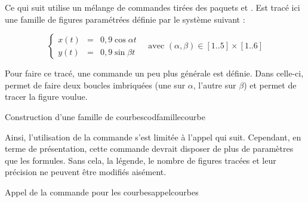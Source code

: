 Ce qui suit utilise un mélange de commandes tirées des paquets  et . Est tracé ici une famille de figures paramétrées définie par le système suivant :

$$
\left\{
\begin{array}{lcr}
x(t)&=& 0,9 \cos \alpha t \\
y(t)&=& 0,9 \sin \beta t  
\end{array}  \quad \textrm{avec } (\alpha,\beta) \in [1..5]\times[1..6]
\right.
$$

Pour faire ce tracé, une commande un peu plus générale est définie. Dans celle-ci,  permet de faire deux boucles imbriquées (une sur $\alpha$, l'autre sur $\beta$) et  permet de tracer la figure voulue.

\begin{codesimple}{Construction d'une famille de courbes}{codfamillecourbe}
\newcommand{\figu}[1]{
\begin{figure}[H]
\begin{center}
\fbox{
\begin{pspicture}(12.3,15.2)
  \multido{\Na=1.1+2.5,\Ia=1+1}{5}{
    \multido{\Nb=13.9+-2.5,\Ib=1+1}{6}{
      \rput{0}(\Na,\Nb){
        \parametricplot[plotstyle=curve,plotpoints=199,linecolor=bleu6,
        algebraic=true]{0}{6.2832}{#1}
        \rput{0}(0,-1.2){\textsf{\footnotesize (\Ia,\Ib)}}}
}}
\end{pspicture}}
\caption{Exemples de fonctions paramétriques}
\end{center}
\end{figure}}
\end{codesimple}


Ainsi, l'utilisation de la  commande s'est limitée à l'appel qui suit. Cependant, en terme de présentation, cette  commande devrait disposer de plus de paramètres que les formules. Sans cela, la légende, le nombre de figures tracées et leur précision ne peuvent être modifiés aisément.

\begin{codesimple}{Appel de la  commande pour les courbes}{appelcourbes}
\end{codesimple}


\newcommand{\figu}[1]{
\begin{figure}[H]
\begin{center}
\fbox{
\begin{pspicture}(12.3,15.2)
  \multido{\Na=1.1+2.5,\Ia=1+1}{5}{
    \multido{\Nb=13.9+-2.5,\Ib=1+1}{6}{
      \rput{0}(\Na,\Nb){
        \parametricplot[plotstyle=curve,plotpoints=199,linecolor=bleu6,algebraic=true]{0}{6.2832}{#1}
        \rput{0}(0,-1.2){\textsf{\footnotesize (\Ia,\Ib)}}}
}}
\end{pspicture}}
$$
\left\{
\begin{array}{lcr}
x(t)&=& 0,9 \cos \alpha t \\
y(t)&=& 0,9 \sin \beta t  
\end{array}  \quad \textrm{avec } (\alpha,\beta) \in [1..5]\times[1..6]
\right.
$$
\caption{Exemples de fonctions paramétriques}
\end{center}
\end{figure}
}

